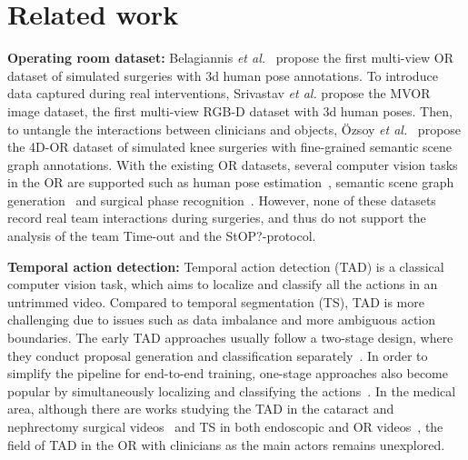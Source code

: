 \section{Related work}
\label{related}

\noindent \textbf{Operating room dataset: } Belagiannis \textit{et al.}~\citep{belagiannis2016parsing} propose the first multi-view OR dataset of simulated surgeries with 3d human pose annotations. To introduce data captured during real interventions, Srivastav \textit{et al.} propose the MVOR image dataset, the first multi-view RGB-D dataset with 3d human poses. Then, to untangle the interactions between clinicians and objects, Özsoy \textit{et al.}~\citep{ozsoy20224d} propose the 4D-OR dataset of simulated knee surgeries with fine-grained semantic scene graph annotations. With the existing OR datasets, several computer vision tasks in the OR are supported such as human pose estimation~\citep{hansen2019fusing,srivastav2022unsupervised}, semantic scene graph generation~\citep{ozsoy2023labrad,pei2024s} and surgical phase recognition~\citep{ozsoy2024holistic}. However, none of these datasets record real team interactions during surgeries, and thus do not support the analysis of the team Time-out and the StOP?-protocol.


\noindent \textbf{Temporal action detection: } Temporal action detection (TAD) is a classical computer vision task, which aims to localize and classify all the actions in an untrimmed video. Compared to temporal segmentation (TS), TAD is more challenging due to issues such as data imbalance and more ambiguous action boundaries. The early TAD approaches usually follow a two-stage design, where they conduct proposal generation and classification separately~\citep{lin2019bmn,xu2020g}. In order to simplify the pipeline for end-to-end training, one-stage approaches also become popular by simultaneously localizing and classifying the actions~\citep{lin2021learning,zhang2022actionformer}. In the medical area, although there are works studying the TAD in the cataract and nephrectomy surgical videos~\citep{hao2023act,chandra2024vitals,luo2024surgplan} and TS in both endoscopic and OR videos~\citep{quellec2014real,dergachyova2016automatic,volkov2017machine,ozsoy20224d}, the field of TAD in the OR with clinicians as the main actors remains unexplored.